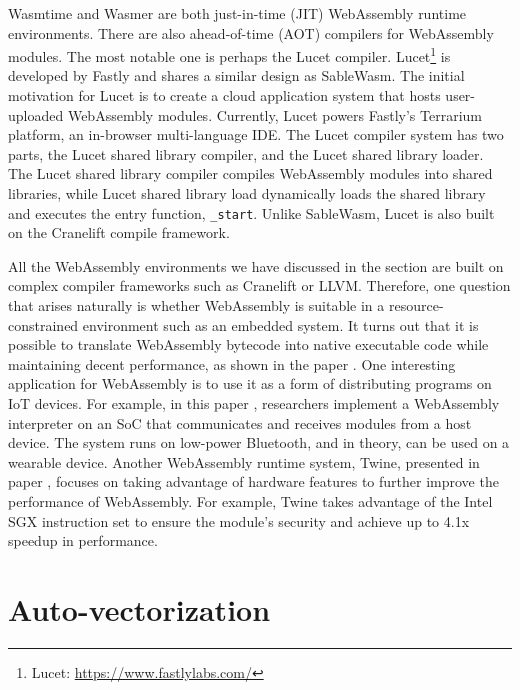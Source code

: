 Wasmtime and Wasmer are both just-in-time (JIT) WebAssembly runtime environments. There are also ahead-of-time (AOT) compilers for WebAssembly modules. The most notable one is perhaps the Lucet compiler. Lucet\footnote{Lucet: \url{https://www.fastlylabs.com/}} is developed by Fastly and shares a similar design as SableWasm. The initial motivation for Lucet is to create a cloud application system that hosts user-uploaded WebAssembly modules. Currently, Lucet powers Fastly's Terrarium platform, an in-browser multi-language IDE. The Lucet compiler system has two parts, the Lucet shared library compiler, and the Lucet shared library loader. The Lucet shared library compiler compiles WebAssembly modules into shared libraries, while Lucet shared library load dynamically loads the shared library and executes the entry function, \texttt{\_start}. Unlike SableWasm, Lucet is also built on the Cranelift compile framework.

All the WebAssembly environments we have discussed in the section are built on complex compiler frameworks such as Cranelift or LLVM. Therefore, one question that arises naturally is whether WebAssembly is suitable in a resource-constrained environment such as an embedded system. It turns out that it is possible to translate WebAssembly bytecode into native executable code while maintaining decent performance, as shown in the paper \cite{webassembly-embedded}. One interesting application for WebAssembly is to use it as a form of distributing programs on IoT devices. For example, in this paper \cite{webassembly-wearables}, researchers implement a WebAssembly interpreter on an SoC that communicates and receives modules from a host device. The system runs on low-power Bluetooth, and in theory, can be used on a wearable device. Another WebAssembly runtime system, Twine, presented in paper \cite{webassembly-sgx}, focuses on taking advantage of hardware features to further improve the performance of WebAssembly. For example, Twine takes advantage of the Intel SGX instruction set to ensure the module's security and achieve up to 4.1x speedup in performance.

\section*{Auto-vectorization}

